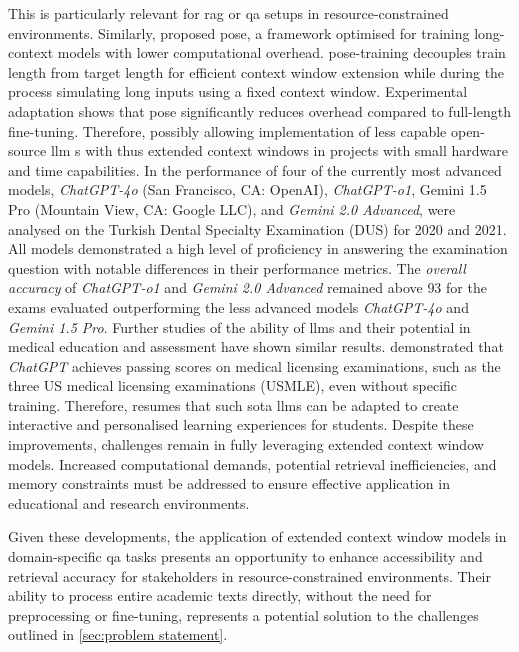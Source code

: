 This is particularly relevant for \ac{rag} or \ac{qa} setups in resource-constrained environments.
%
Similarly, \citet{zhu2024poseefficientcontextwindow} proposed \ac{pose}, a framework optimised for training long-context models with lower computational overhead. 
\ac{pose}-training decouples train length from target length for efficient context window extension while during the process simulating long inputs using a fixed context window.
Experimental adaptation shows that \ac{pose} significantly reduces overhead compared to full-length fine-tuning\citep{zhu2024poseefficientcontextwindow}.
Therefore, possibly allowing implementation of less capable open-source \ac{llm} s with thus extended context windows in projects with small hardware and time capabilities.
In \citet{kinikogluI2025GPTGemini} the performance of four of the currently most advanced models, \textit{ChatGPT-4o} (San Francisco, CA: OpenAI), \textit{ChatGPT-o1}, Gemini 1.5 Pro (Mountain View, CA: Google LLC), and \textit{Gemini 2.0 Advanced}, were analysed on the Turkish Dental Specialty Examination (DUS) for 2020 and 2021.
All models demonstrated a high level of proficiency in answering the examination question with notable differences in their performance metrics.
%
The \textit{overall accuracy} of \textit{ChatGPT-o1} and \textit{Gemini 2.0 Advanced} remained above $93$ for the exams evaluated outperforming the less advanced models \textit{ChatGPT-4o} and \textit{Gemini 1.5 Pro}.
Further studies of the ability of \ac{llm}s and their potential in medical education and assessment have shown similar results.
%
\citet{USMLE2023, chatgpt2023USMLE} demonstrated that \textit{ChatGPT} achieves passing scores on medical licensing examinations, such as the three US medical licensing examinations (USMLE), even without specific training. 
Therefore, \citet{kinikogluI2025GPTGemini} resumes that such \ac{sota} \ac{llm}s can be adapted to create interactive and personalised learning experiences for students.
%
Despite these improvements, challenges remain in fully leveraging extended context window models. 
Increased computational demands, potential retrieval inefficiencies, and memory constraints must be addressed to ensure effective application in educational and research environments. 

Given these developments, the application of extended context window models in domain-specific \ac{qa} tasks presents an opportunity to enhance accessibility and retrieval accuracy for stakeholders in resource-constrained environments.
Their ability to process entire academic texts directly, without the need for preprocessing or fine-tuning, represents a potential solution to the challenges outlined in \cref{sec:problem statement}.

